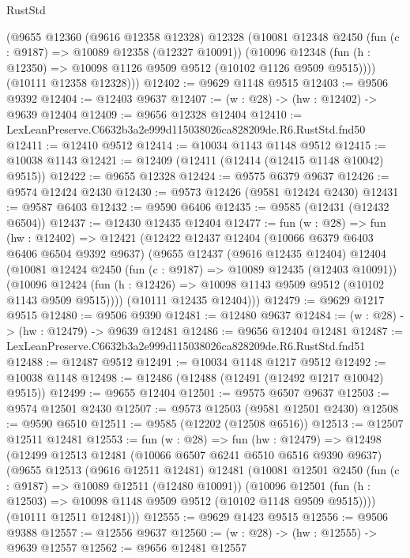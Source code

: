 \begin{lexlean}{RustStd}
\begin{coremodule}
      (@9655
        @12360
        (@9616 @12358 @12328)
        @12328
        (@10081
          @12348
          @2450
          (fun (c : @9187) => @10089 @12358 (@12327 @10091))
          (@10096 @12348 (fun (h : @12350) => @10098 @1126 @9509 @9512 (@10102 @1126 @9509 @9515))))
        (@10111 @12358 @12328)))
@12402 := @9629 @1148 @9515
@12403 := @9506 @9392
@12404 := @12403 @9637
@12407 := (w : @28) -> (hw : @12402) -> @9639 @12404
@12409 := @9656 @12328 @12404
@12410 := LexLeanPreserve.C6632b3a2e999d115038026ca828209de.R6.RustStd.fnd50
@12411 := @12410 @9512
@12414 := @10034 @1143 @1148 @9512
@12415 := @10038 @1143
@12421 := @12409 (@12411 (@12414 (@12415 @1148 @10042) @9515))
@12422 := @9655 @12328
@12424 := @9575 @6379 @9637
@12426 := @9574 @12424 @2430
@12430 := @9573 @12426 (@9581 @12424 @2430)
@12431 := @9587 @6403
@12432 := @9590 @6406
@12435 := @9585 (@12431 (@12432 @6504))
@12437 := @12430 @12435 @12404
@12477 := fun (w : @28) =>
  fun (hw : @12402) =>
  @12421
    (@12422
      @12437
      @12404
      (@10066 @6379 @6403 @6406 @6504 @9392 @9637)
      (@9655
        @12437
        (@9616 @12435 @12404)
        @12404
        (@10081
          @12424
          @2450
          (fun (c : @9187) => @10089 @12435 (@12403 @10091))
          (@10096 @12424 (fun (h : @12426) => @10098 @1143 @9509 @9512 (@10102 @1143 @9509 @9515))))
        (@10111 @12435 @12404)))
@12479 := @9629 @1217 @9515
@12480 := @9506 @9390
@12481 := @12480 @9637
@12484 := (w : @28) -> (hw : @12479) -> @9639 @12481
@12486 := @9656 @12404 @12481
@12487 := LexLeanPreserve.C6632b3a2e999d115038026ca828209de.R6.RustStd.fnd51
@12488 := @12487 @9512
@12491 := @10034 @1148 @1217 @9512
@12492 := @10038 @1148
@12498 := @12486 (@12488 (@12491 (@12492 @1217 @10042) @9515))
@12499 := @9655 @12404
@12501 := @9575 @6507 @9637
@12503 := @9574 @12501 @2430
@12507 := @9573 @12503 (@9581 @12501 @2430)
@12508 := @9590 @6510
@12511 := @9585 (@12202 (@12508 @6516))
@12513 := @12507 @12511 @12481
@12553 := fun (w : @28) =>
  fun (hw : @12479) =>
  @12498
    (@12499
      @12513
      @12481
      (@10066 @6507 @6241 @6510 @6516 @9390 @9637)
      (@9655
        @12513
        (@9616 @12511 @12481)
        @12481
        (@10081
          @12501
          @2450
          (fun (c : @9187) => @10089 @12511 (@12480 @10091))
          (@10096 @12501 (fun (h : @12503) => @10098 @1148 @9509 @9512 (@10102 @1148 @9509 @9515))))
        (@10111 @12511 @12481)))
@12555 := @9629 @1423 @9515
@12556 := @9506 @9388
@12557 := @12556 @9637
@12560 := (w : @28) -> (hw : @12555) -> @9639 @12557
@12562 := @9656 @12481 @12557

\end{coremodule}
\end{lexlean}
